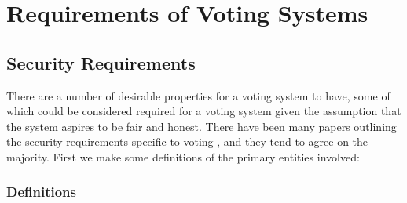 
\chapter{Requirements of Voting Systems}
\label{ch:req}

\section{Security Requirements}
\label{ch:req:sec}

There are a number of desirable properties for a voting system to have, some of which could be considered required for a voting system given the assumption that the system aspires to be fair and honest. There have been many papers outlining the security requirements specific to voting \cite{epstein_electronic_2007,delaune_formalising_2010,li_taxonomy_2014,hastings_security_2011}, and they tend to agree on the majority. First we make some definitions of the primary entities involved:

\subsection{Definitions}
\label{ch:req:defs}

